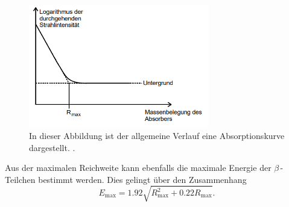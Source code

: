 \begin{figure}
    \centering
    \includegraphics[width = 0.7\textwidth]{content/Absorptionskurve.PNG}
    \caption{In dieser Abbildung ist der allgemeine Verlauf eine Absorptionskurve dargestellt. \cite{v704}.}
    \label{fig:Absorptionskurve}
\end{figure}

Aus der maximalen Reichweite kann ebenfalls die maximale Energie der $\beta$\,-Teilchen bestimmt werden. Dies gelingt über den Zusammenhang 
\begin{equation}
    \label{eqn:E_max}
    E_{\text{max}} = 1.92\sqrt{R_{\text{max}}^2 + 0.22R_{\text{max}}}.
\end{equation}

